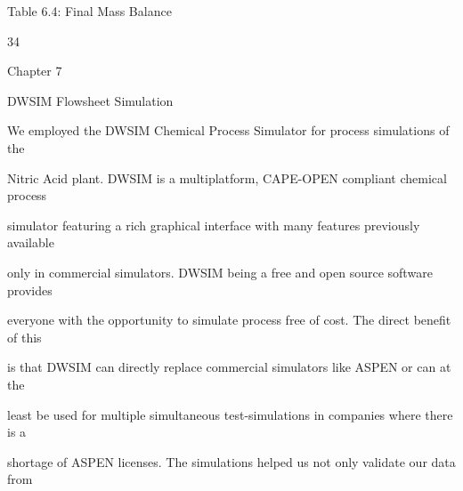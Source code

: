 \documentclass[a4paper,portrait,12pt]{article}
\begin{document}
\begin{flushleft}
Table 6.4: Final Mass Balance
\end{flushleft}





34





\begin{flushleft}
\newpage
Chapter 7
\end{flushleft}





\begin{flushleft}
DWSIM Flowsheet Simulation
\end{flushleft}


\begin{flushleft}
We employed the DWSIM Chemical Process Simulator for process simulations of the
\end{flushleft}


\begin{flushleft}
Nitric Acid plant. DWSIM is a multiplatform, CAPE-OPEN compliant chemical process
\end{flushleft}


\begin{flushleft}
simulator featuring a rich graphical interface with many features previously available
\end{flushleft}


\begin{flushleft}
only in commercial simulators. DWSIM being a free and open source software provides
\end{flushleft}


\begin{flushleft}
everyone with the opportunity to simulate process free of cost. The direct benefit of this
\end{flushleft}


\begin{flushleft}
is that DWSIM can directly replace commercial simulators like ASPEN or can at the
\end{flushleft}


\begin{flushleft}
least be used for multiple simultaneous test-simulations in companies where there is a
\end{flushleft}


\begin{flushleft}
shortage of ASPEN licenses. The simulations helped us not only validate our data from
\end{flushleft}
\end{document}
